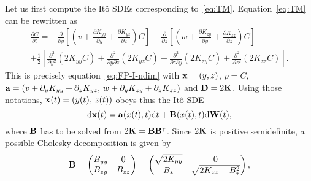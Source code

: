 Let us first compute the Itô SDEs corresponding to~\eqref{eq:TM}. Equation~\eqref{eq:TM} can be rewritten as
\begin{multline}
	\frac{\partial C}{\partial t} = -\frac{\partial}{\partial y}\left[\left(v+\frac{\partial K_{yy}}{\partial y} + \frac{\partial K_{yz}}{\partial z}\right)C\right] -\frac{\partial}{\partial z}\left[\left(w+\frac{\partial K_{zy}}{\partial y} + \frac{\partial K_{zz}}{\partial z}\right)C\right]\\
	+ \frac{1}{2}\left[\frac{\partial^2}{\partial y^2} \left(2K_{yy} C\right) + \frac{\partial^2}{\partial y \partial z} \left(2K_{yz} C\right) + \frac{\partial^2}{\partial z \partial y} \left(2K_{zy} C\right) + \frac{\partial^2}{\partial z^2} \left(2K_{zz} C\right) \right].
\end{multline}
\vspace*{.1cm}
This is precisely equation~\eqref{eq:FP-I-ndim} with $\mathbf x =(y,z)$, $p=C$, $\mathbf a = (v+\partial_y K_{yy} + \partial_z K_{yz},\, w+\partial_y K_{zy} + \partial_z K_{zz})$ and $\mathbf D = 2\mathbf K$. Using those notations, $\mathbf x(t) = (y(t),\, z(t))$ obeys thus the Itô SDE
\begin{equation} \label{eq:ito-TM-vec}
	\mathrm d \mathbf x(t) = \mathbf a(x(t),t) \mathrm dt + \mathbf B(x(t),t) \mathrm d \mathbf W(t),
\end{equation}
where $\mathbf B$ has to be solved from $2\mathbf K = \mathbf B \mathbf B^{\intercal}$. Since $2\mathbf K$ is positive semidefinite, a possible Cholesky decomposition is given by
\begin{equation} \label{eq:B}
	\mathbf B = \begin{pmatrix} B_{yy} & 0 \\ B_{zy} & B_{zz} \end{pmatrix} = \begin{pmatrix} \sqrt{2K_{yy}} & 0 \\ B_* & \sqrt{2K_{zz}-B_*^2} \end{pmatrix},
\end{equation}
